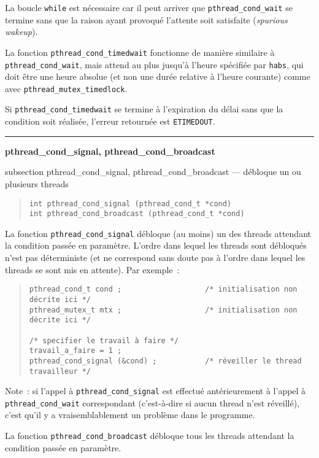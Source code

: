 \documentclass [twoside] {report}
\newcommand {\primitive} [1]
    {
	{\large \bf #1}
	\addcontentsline {toc} {subsection} {#1}
    }
\newcommand {\separation}
    {
	\vspace {7mm}
	\nopagebreak
	\hrule
    }
\begin{document}
La boucle \texttt {while} est nécessaire car il peut arriver que
\verb|pthread_cond_wait| se termine sans que la raison ayant provoqué
l'attente soit satisfaite (\textit {spurious wakeup}).

La fonction \verb|pthread_cond_timedwait| fonctionne de manière
similaire à \verb|pthread_cond_wait|, mais attend au plus jusqu'à
l'heure spécifiée par \texttt {habs}, qui doit être une heure absolue
(et non une durée relative à l'heure courante) comme avec
\verb|pthread_mutex_timedlock|.

Si \verb|pthread_cond_timedwait| se termine à l'expiration du délai
sans que la condition soit réalisée, l'erreur retournée est \texttt
{ETIMEDOUT}.


\separation
\primitive {pthread\_cond\_signal, pthread\_cond\_broadcast} --- débloque un ou plusieurs threads

\begin {quote}
\begin {verbatim}
int pthread_cond_signal (pthread_cond_t *cond)
int pthread_cond_broadcast (pthread_cond_t *cond)
\end{verbatim}
\end {quote}

La fonction \verb|pthread_cond_signal| débloque (au moins) un des threads
attendant la condition passée en paramètre. L'ordre dans lequel les
threads sont débloqués n'est pas déterministe (et ne correspond sans
doute pas à l'ordre dans lequel les threads se sont mis en attente).
Par exemple~:

\begin {quote}
\small
\begin {verbatim}
pthread_cond_t cond ;                   /* initialisation non décrite ici */
pthread_mutex_t mtx ;                   /* initialisation non décrite ici */

/* specifier le travail à faire */
travail_a_faire = 1 ;
pthread_cond_signal (&cond) ;           /* réveiller le thread travailleur */
\end{verbatim}
\end {quote}

Note~: si l'appel à \verb|pthread_cond_signal| est effectué
antérieurement à l'appel à \verb|pthread_cond_wait| correspondant
(c'est-à-dire si aucun thread n'est réveillé), c'est qu'il y a
vraisemblablement un problème dans le programme.

La fonction \verb|pthread_cond_broadcast| débloque tous les threads
attendant la condition passée en paramètre.
\end{document}
